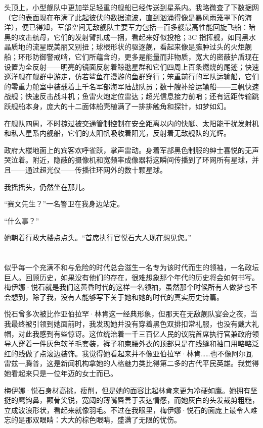 \documentclass[AutoFakeBold=true]{book}
\begin{document}
头顶上，小型舰队中更加举足轻重的舰船已经传送到星系内。我略微查了下数据网（它的表面现在布满了此起彼伏的数据流波，直到汹涌得像是暴风雨笼罩下的海洋），便已得知，军部空间无敌舰队主要军力包括一百多艘最高性能回旋飞船：暗黑的攻击航母，它们的发射臂扎成一捆，看起来好似投枪；3C 指挥舰，如同黑水晶质地的流星既美丽又别扭；球根形状的驱逐舰，看起来像是臃肿过头的火炬舰船；环形防御警戒哨，它们所蕴含的，更多是能量而非物质，宽大的密蔽护盾现在设置为全反射——明亮的镜面反射着鲸逖星群和它们四周上百条燃烧的尾迹；快速巡洋舰在舰群中游走，仿若鲨鱼在漫游的鱼群穿行；笨重前行的军队运输船，它们的零重力舱室中装载着上千名军部海军陆战队员；数十艘补给运输船——三帆快速战舰；快速反击战斗机；鱼雷火炮定位雷达；超光信息接力前哨；还有远距传输跳跃舰船本身，庞大的十二面体船壳植满了一排排触角和探针，如梦如幻。

在舰队四周，不时掠过被交通管制控制在安全距离以内的快艇、太阳能干扰发射机和私人星系内舰船，它们的太阳帆吸收着阳光，反射着无敌舰队的光辉。

政府大楼地面上的宾客欢呼雀跃，掌声雷动。身着军部黑色制服的绅士喜悦的无声哭泣着。附近，隐蔽的摄像机和宽频率成像器将这瞬间传播到了环网所有星球，并且——通过超光仪——传播往环网外的数十颗星球。

我摇摇头，仍然坐在那儿。

``赛文先生？''一名警卫在我身边站定。

``什么事？''

她朝着行政大楼点点头。``首席执行官悦石大人现在想见您。''

\chapter{}

似乎每一个充满不和与危险的时代总会滋生一名专为该时代而生的领袖，一名政坛巨人。回顾历史，如果没有他们的存在，很难想象那个年代的历史将会如何书写。梅伊娜·悦石就是我们这黄昏时代的这样一名领袖，虽然那个时候所有人做梦也不会想到，除了我，没有人能够写下关于她和她的时代的真实历史诗篇。

悦石曾多次被比作亚伯拉罕·林肯这一经典形象，但那天在无敌舰队宴会之夜，当我最终被引领到她面前时，我发现她并没有穿着黑色双排扣常礼服，也没有戴大礼帽，对此我感到有些惊讶。这位统治着一千三百亿人民的议院首席执行官兼政府领导人穿着一件灰色软羊毛套装，裤子和柬腰外衣的顶部只是在线缝和袖口用略略泛红的线做了点滚边装饰。我觉得她看起来并不像亚伯拉罕·林肯……也不像阿尔瓦雷兹一腾普，这是新闻机构拿她的人格魅力类比得第二多的古代平民英雄。我觉得她看起来只是一位年迈的女士而已。

梅伊娜·悦石身材高挑，瘦削，但是她的面容比起林肯来更为冷硬如鹰。她拥有坚挺的鹰钩鼻，颧骨尖锐，宽阔的薄嘴唇善于表达情感，而她灰白的头发裁剪粗糙，立成波浪形状，看起来就像羽毛。不过在我眼里，梅伊娜·悦石的面庞上最令人难忘的是那双眼睛：大大的棕色眼睛，盛满了无限的忧伤。
\end{document}

